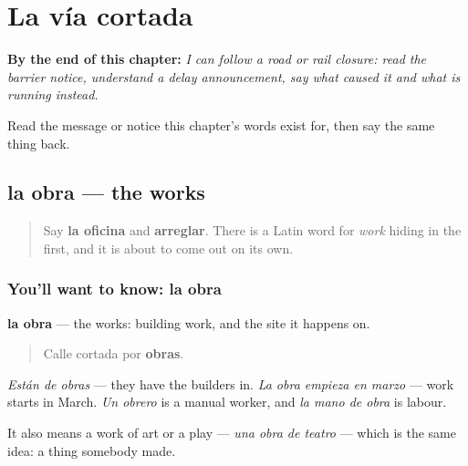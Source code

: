 
\chapter{La vía cortada}
\label{ch:es-corte}

\begin{chapteropening}
\textbf{By the end of this chapter:} \emph{I can follow a road or rail closure: read the barrier notice, understand a delay announcement, say what caused it and what is running instead.}

Read the message or notice this chapter's words exist for, then say the same thing back.
\end{chapteropening}

\section[la obra]{la obra — the works}

\label{lesson:ES-C454-obra}



\begin{quote}
Say \textbf{la oficina} and \textbf{arreglar}. There is a Latin word for \emph{work} hiding in the first, and it is about to come out on its own.
\end{quote}

\subsection*{You'll want to know: la obra}
\textbf{la obra} — the works: building work, and the site it happens on.

\begin{quote}
Calle cortada por \textbf{obras}.
\end{quote}

\emph{Están de obras} — they have the builders in. \emph{La obra empieza en marzo} — work starts in March. \emph{Un obrero} is a manual worker, and \emph{la mano de obra} is labour.

It also means a work of art or a play — \emph{una obra de teatro} — which is the same idea: a thing somebody made.


